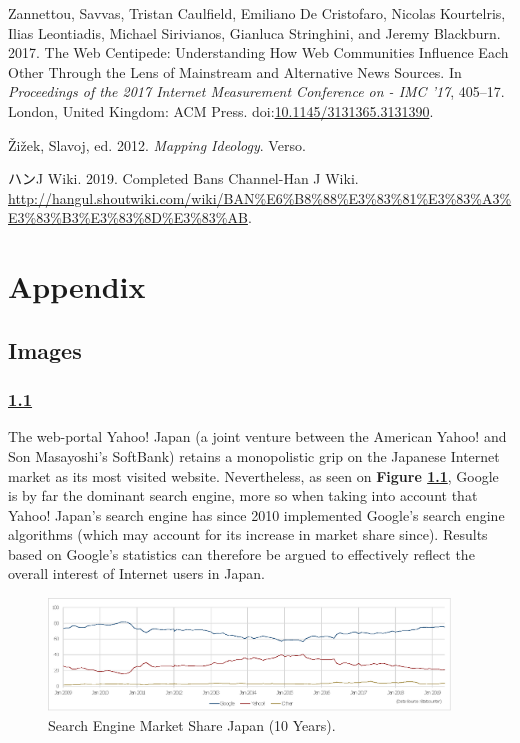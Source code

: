 \documentclass[10pt,british,A4paper,,openany]{memoir}
\begin{document}
\hypertarget{ref-zannettou_web_2017}{}
Zannettou, Savvas, Tristan Caulfield, Emiliano De Cristofaro, Nicolas
Kourtelris, Ilias Leontiadis, Michael Sirivianos, Gianluca Stringhini,
and Jeremy Blackburn. 2017. The Web Centipede: Understanding How Web
Communities Influence Each Other Through the Lens of Mainstream and
Alternative News Sources. In \emph{Proceedings of the 2017 Internet
Measurement Conference on - IMC '17}, 405--17. London, United Kingdom:
ACM Press.
doi:\href{https://doi.org/10.1145/3131365.3131390}{10.1145/3131365.3131390}.

\hypertarget{ref-zizek_mapping_2012}{}
Žižek, Slavoj, ed. 2012. \emph{Mapping Ideology}. Verso.

\hypertarget{ref-j_wiki_completed_2019}{}
ハンJ Wiki. 2019. Completed Bans Channel-Han J Wiki.
\url{http://hangul.shoutwiki.com/wiki/BAN\%E6\%B8\%88\%E3\%83\%81\%E3\%83\%A3\%E3\%83\%B3\%E3\%83\%8D\%E3\%83\%AB}.

\endgroup

\newpage

\appendix
{} 

\chapter{Appendix}\label{appendix}

\section{Images}\label{images}

\subsection{\texorpdfstring{\ref{fig:searchengine}}{}}\label{section}

The web-portal Yahoo! Japan (a joint venture between the American Yahoo!
and Son Masayoshi's SoftBank) retains a monopolistic grip on the
Japanese Internet market as its most visited website. Nevertheless, as
seen on \textbf{Figure \ref{fig:searchengine}}, Google is by far the
dominant search engine, more so when taking into account that Yahoo!
Japan's search engine has since 2010 implemented Google's search engine
algorithms (which may account for its increase in market share since).
Results based on Google's statistics can therefore be argued to
effectively reflect the overall interest of Internet users in Japan.

\begin{figure}[!htb]
 \centering
 \caption{\label{fig:searchengine} Search Engine Market Share Japan (10 Years).}
 \includegraphics[width=0.95\textwidth,trim=4 4 4 4,clip]{images/searchengine.eps}
 \end{figure}
\end{document}
